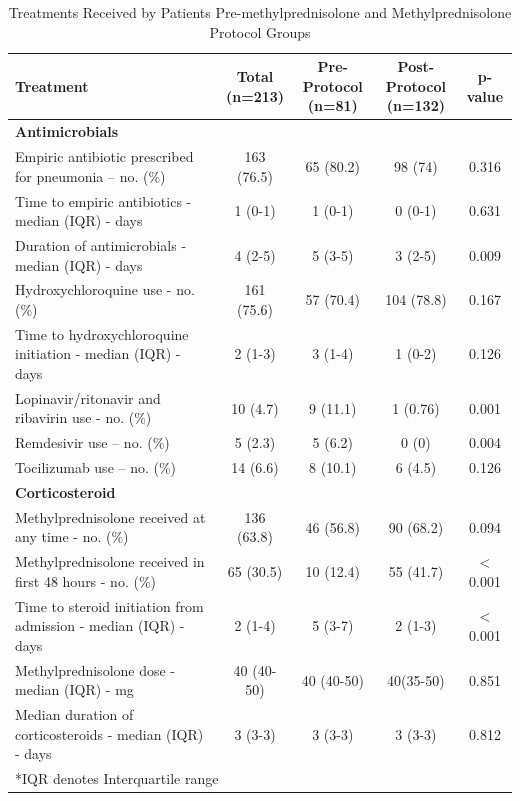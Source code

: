 \documentclass[Minh_PhD_thesis.tex]{subfiles}
\begin{document}
\begin{table}
\footnotesize
\caption{Treatments Received by Patients Pre-methylprednisolone and Methylprednisolone Protocol Groups}
\begin{center}
\begin{tabular}{p{7.5cm} cccc}
\hline
\textbf{Treatment} & 	\makecell{\textbf{Total} \\ \textbf{(n=213)}} &	\makecell{\textbf{Pre-Protocol} \\ \textbf{(n=81)}}	&\makecell{\textbf{Post-Protocol} \\ \textbf{(n=132)}}	& \textbf{p-value}\\
\hline
\multicolumn{5}{l}{\textbf{Antimicrobials}}\\
\hline
Empiric antibiotic prescribed for pneumonia -- no. (\%)	&163 (76.5)&	65 (80.2)	&98 (74)	&0.316\\
Time to empiric antibiotics - median (IQR) - days	&1 (0-1)&	1 (0-1)	&0 (0-1)	&0.631\\
Duration of antimicrobials - median (IQR) - days	&4 (2-5)	&5 (3-5)	&3 (2-5)	&0.009\\
Hydroxychloroquine use - no. (\%)	&161 (75.6)	&57 (70.4)&	104 (78.8)&	0.167\\
Time to hydroxychloroquine initiation - median (IQR) - days&	2 (1-3)	&3 (1-4)&	1 (0-2)&	0.126\\

Lopinavir/ritonavir and ribavirin use - no. (\%)&	10 (4.7)	&9 (11.1)	&1 (0.76)	&0.001\\
Remdesivir use -- no. (\%)	&5 (2.3)&	5 (6.2)	&0 (0)&	0.004\\
Tocilizumab use -- no. (\%)	&14 (6.6)&	8 (10.1)	&6 (4.5)	&0.126\\

\hline
\multicolumn{5}{l}{\textbf{Corticosteroid }}\\
\hline

Methylprednisolone received at any time - no. (\%)	&136 (63.8)&	46 (56.8)	&90 (68.2)	&0.094\\
Methylprednisolone received in first 48 hours - no. (\%)&	65 (30.5)	&10 (12.4)&	55 (41.7)	&$<$0.001\\
Time to steroid initiation from admission - median (IQR) - days &	2 (1-4)&	5 (3-7)	&2 (1-3)&	$<$0.001\\
Methylprednisolone dose - median (IQR) - mg	&40 (40-50)	&40 (40-50)&	40(35-50)	&0.851\\
Median duration of corticosteroids - median (IQR) - days&	3 (3-3)&	3 (3-3)&	3 (3-3)	&0.812\\


\hline

\multicolumn{5}{l}{*IQR denotes Interquartile range} \\
\end{tabular}

\end{center}
\label{additionaltreatment}
\end{table}%
\end{document}
